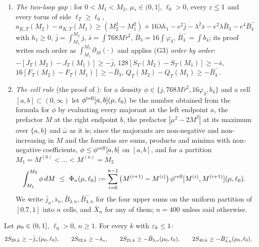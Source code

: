 \begin{enumerate}[label=\textup{(G\arabic*)},leftmargin=*]
\begin{gather*}
b_4\defeq\varphi_A+28M\bar\delta\bar\tau+\varphi_{D2},\quad \varphi_A\defeq6M\big[2\sqrt2\,\bar\Theta\bar J'_{3/2}+|\mu_*^2-2M^2|\bar\psi\bar J'_0+3\sqrt3\,\bar\omega\bar J'_1\big]+\bar\beta\bar\psi,\\
\varphi_{D2}\defeq2M\bar\psi(2\bar\psi+4\bar\delta)+\min\{8M\bar\psi(6\bar\psi+2\bar\tau+4\bar\delta),\ 2^{5/2}M(2\bar\Lambda_1+4\bar\Lambda_2)\bar\Lambda_0\},
\end{gather*}
one has $0\le\partial_MJ_T\le j(M)$, $0\le-128\,\partial_MS_T\le768M\bar\tau(M)^2$, $|\partial_MF_T|\le\varphi_3(M)$ and $\partial_MQ_T\ge-b_4(M)$.
\item \emph{The two-loop gap} \cite[Prop.~G.3]{SymPhase}: for $0<M_1<M_2$, $\mu_*\in(0,1]$, $\ell_0>0$, every $\varepsilon\le1$ and every torus of side $\ell_T\ge\ell_0$, $a_{K,T}(M_2)-a_{K,T}(M_1)\ge(M_2^2-M_1^2)+16\lambda h_1-e^2\bar j-\lambda^2\bar s-e^2\lambda\bar B_3-e^4\bar B_4^-$ with $h_1\ge0$, $\bar j=\int_{M_1}^{M_2}j$, $\bar s=\int768M\bar\tau^2$, $\bar B_3=16\int\varphi_3$, $\bar B_4^-=\int b_4$; its proof writes each order as $\int_{M_1}^{M_2}\partial_M(\cdot)$ and applies (G3) \emph{order by order}: $-[J_T(M_2)-J_T(M_1)]\ge-\bar j$, $128[S_T(M_2)-S_T(M_1)]\ge-\bar s$, $16[F_T(M_2)-F_T(M_1)]\ge-\bar B_3$, $Q_T(M_2)-Q_T(M_1)\ge-\bar B_4^-$.
\item \emph{The cell rule} (the proof of \cite[Cor.~G.4]{SymPhase}): for a density $\phi\in\{j,768M\bar\tau^2,16\varphi_3,b_4\}$ and a cell $[a,b]\subset(0,\infty)$ let $\phi^{\rm cell}[a,b](\mu,\ell_0)$ be the number obtained from the formula for $\phi$ by evaluating every majorant at the left endpoint $a$, the prefactor $M$ at the right endpoint $b$, the prefactor $|\mu^2-2M^2|$ at its maximum over $\{a,b\}$ and $\bar\omega$ as it is; since the majorants are non-negative and non-increasing in $M$ and the formulas are sums, products and minima with non-negative coefficients, $\phi\le\phi^{\rm cell}[a,b]$ on $[a,b]$, and for a partition $M_1=M^{(0)}<\dots<M^{(n)}=M_2$
\begin{equation}\label{eq:s14:cell}
\int_{M_1}^{M_2}\phi\,dM\ \le\ \Phi_n(\mu,\ell_0)\defeq\sum_{i=0}^{n-1}\big(M^{(i+1)}-M^{(i)}\big)\,\phi^{\rm cell}[M^{(i)},M^{(i+1)}](\mu,\ell_0).
\end{equation}
We write $\bar j_n,\bar s_n,\bar B_{3,n},\bar B^-_{4,n}$ for the four upper sums on the uniform partition of $[0.7,1]$ into $n$ cells, and $\bar X_n$ for any of them; $n=400$ unless said otherwise.
\end{enumerate}

\begin{lemma}\label{lem:s14:E}
Let $\mu_0\in(0,1]$, $\ell_0>0$, $n\ge1$. For every $k$ with $\varepsilon_k\le1$:
\[
2S_{20,k}\ge-\bar j_n(\mu_0,\ell_0),\qquad 2S_{02,k}\ge-\bar s_n,\qquad 2S_{21,k}\ge-\bar B_{3,n}(\mu_0,\ell_0),\qquad 2S_{40,k}\ge-\bar B^-_{4,n}(\mu_0,\ell_0).
\]
\end{lemma}

